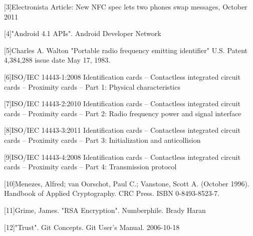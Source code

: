 \documentclass{themeensg}
\begin{document}
[3]Electronista Article: New NFC spec lets two phones swap messages, October 2011

[4]"Android 4.1 APIs". Android Developer Network

[5]Charles A. Walton "Portable radio frequency emitting identifier" U.S. Patent 4,384,288 issue date May 17, 1983.

[6]ISO/IEC 14443-1:2008 Identification cards -- Contactless integrated circuit cards -- Proximity cards -- Part 1: Physical characteristics

[7]ISO/IEC 14443-2:2010 Identification cards -- Contactless integrated circuit cards -- Proximity cards -- Part 2: Radio frequency power and signal interface

[8]ISO/IEC 14443-3:2011 Identification cards -- Contactless integrated circuit cards -- Proximity cards -- Part 3: Initialization and anticollision

[9]ISO/IEC 14443-4:2008 Identification cards -- Contactless integrated circuit cards -- Proximity cards -- Part 4: Transmission protocol

[10]Menezes, Alfred; van Oorschot, Paul C.; Vanstone, Scott A. (October 1996). Handbook of Applied Cryptography. CRC Press. ISBN 0-8493-8523-7.

[11]Grime, James. "RSA Encryption". Numberphile. Brady Haran

[12]"Trust". Git Concepts. Git User's Manual. 2006-10-18




\newevenpage
\nocite{*}


\end{document}
